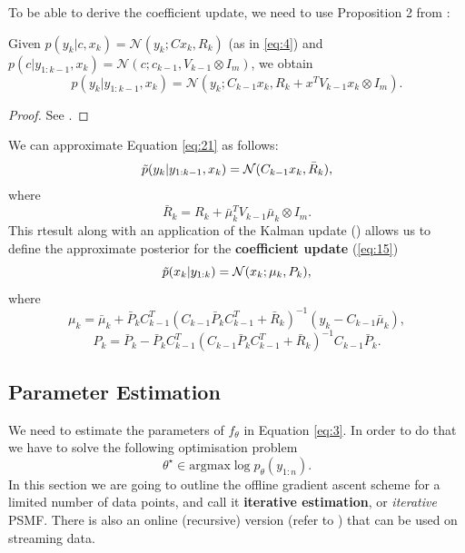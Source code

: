 \documentclass{mldsmsc}
\begin{document}
\noindent To be able to derive the coefficient update, we need to use Proposition 2 from \cite{akyildiz2021probabilistic}:
\begin{proposition}
    Given $p(y_k | c, x_k) = \mathcal{N}(y_k; Cx_k, R_k)$ (as in \ref{eq:4}) and $p(c | y_{1:k-1}, x_k) = \mathcal{N}(c; c_{k-1}, V_{k-1} \otimes I_m)$, we obtain
    \begin{equation}\label{eq:21}
        p(y_k | y_{1:k-1}, x_k) = \mathcal{N}(y_k; C_{k-1} x_k, R_k + x^T V_{k-1} x_k \otimes I_m).
    \end{equation}
\end{proposition}
\begin{proof}
    See \cite{akyildiz2021probabilistic}.
\end{proof}\newline

\noindent We can approximate Equation \ref{eq:21} as follows:
\begin{equation}
    \Tilde{p}(y_k | y_{1:k-1}, x_k) = \mathcal{N}(C_{k-1} x_k, \bar{R}_k),
\end{equation}
where
\begin{equation}
    \bar{R}_k = R_k + \bar{\mu}_k^T V_{k-1} \bar{\mu}_k \otimes I_m.
\end{equation}
This rtesult along with an application of the Kalman update (\cite{anderson1979optimal}) allows us to define the approximate posterior for the \textbf{coefficient update} (\ref{eq:15})
\begin{equation}
    \Tilde{p}(x_k | y_{1:k}) = \mathcal{N}(x_k; \mu_k, P_k),
\end{equation}
where 
\begin{equation}
    \mu_k = \bar{\mu}_k +  \bar{P}_k C_{k-1}^T \left(C_{k-1} \bar{P}_k C_{k-1}^T + \bar{R}_k\right)^{-1} (y_k - C_{k-1} \bar{\mu}_k),
\end{equation}
\begin{equation} \label{eq:6}
    P_k = \bar{P}_k - \bar{P}_k C_{k-1}^T \left(C_{k-1} \bar{P}_k C_{k-1}^T + \bar{R}_k\right)^{-1} C_{k-1} \bar{P}_k.
\end{equation}

\subsection{Parameter Estimation}\label{subsec:param-est-psmf}

We need to estimate the parameters of $f_{\theta}$ in Equation \ref{eq:3}. In order to do that we have to solve the following optimisation problem
\begin{equation}
    \theta^{\star} \in \text{argmax} \log p_{\theta}(y_{1:n}).
\end{equation}
In this section we are going to outline the offline gradient ascent scheme for a limited number of data points, and call it \textbf{iterative estimation}, or \textit{iterative} PSMF. There is also an online (recursive) version (refer to \cite{akyildiz2021probabilistic}) that can be used on streaming data. \newline
\end{document}
